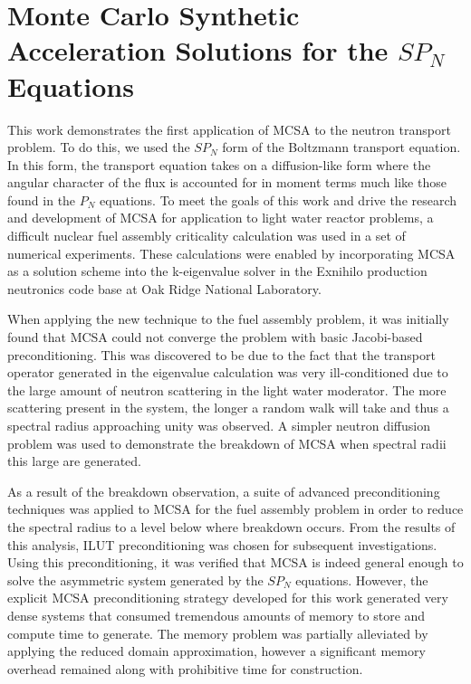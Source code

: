 \section{Monte Carlo Synthetic Acceleration Solutions for the $SP_N$ Equations\ }
\label{sec:spn_conclusion}

This work demonstrates the first application of MCSA to the neutron
transport problem. To do this, we used the $SP_N$ form of the
Boltzmann transport equation. In this form, the transport equation
takes on a diffusion-like form where the angular character of the flux
is accounted for in moment terms much like those found in the $P_N$
equations. To meet the goals of this work and drive the research and
development of MCSA for application to light water reactor problems, a
difficult nuclear fuel assembly criticality calculation was used in a
set of numerical experiments. These calculations were enabled by
incorporating MCSA as a solution scheme into the k-eigenvalue solver
in the Exnihilo production neutronics code base at Oak Ridge National
Laboratory.

When applying the new technique to the fuel assembly problem, it was
initially found that MCSA could not converge the problem with basic
Jacobi-based preconditioning. This was discovered to be due to the
fact that the transport operator generated in the eigenvalue
calculation was very ill-conditioned due to the large amount of
neutron scattering in the light water moderator. The more scattering
present in the system, the longer a random walk will take and thus a
spectral radius approaching unity was observed. A simpler neutron
diffusion problem was used to demonstrate the breakdown of MCSA when
spectral radii this large are generated.

As a result of the breakdown observation, a suite of advanced
preconditioning techniques was applied to MCSA for the fuel assembly
problem in order to reduce the spectral radius to a level below where
breakdown occurs. From the results of this analysis, ILUT
preconditioning was chosen for subsequent investigations. Using this
preconditioning, it was verified that MCSA is indeed general enough to
solve the asymmetric system generated by the $SP_N$
equations. However, the explicit MCSA preconditioning strategy
developed for this work generated very dense systems that consumed
tremendous amounts of memory to store and compute time to
generate. The memory problem was partially alleviated by applying the
reduced domain approximation, however a significant memory overhead
remained along with prohibitive time for construction.

